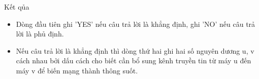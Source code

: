 Kết qủa  
\begin{itemize}
	\item     Dòng đầu tiên ghi 'YES' nếu câu trả lời là khẳng định, ghi 'NO' nếu câu trả lời là phủ định.   
	\item     Nếu câu trả lời là khẳng định thì dòng thứ hai ghi hai số nguyên dương u, v cách nhau bởi dấu cách cho biết cần bổ sung kênh truyền tin từ máy u đến máy v để biến mạng thành thông suốt.   
\end{itemize}